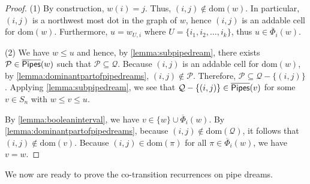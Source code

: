 \documentclass[12 pt]{amsart}
\newcommand{\dom}{\mathrm{dom}}
\numberwithin{equation}{section}
\theoremstyle{remark}
\newcommand{\kpipes}{\overline{\sf Pipes}}
\newcommand{\kcotransitionperms}{\overline{\Phi}}
\begin{document}
		\begin{proof}
			\noindent (1) By construction, $w(i) = j$. Thus, $(i,j)\notin \dom(w)$. 
			In particular, $(i,j)$ is a northwest most dot in the graph of $w$, hence $(i,j)$ is an addable cell for $\dom(w)$. Furthermore, $u=w_{U,i}$ where $U=\{i_1,i_2,\ldots,i_k\}$, thus $u\in \kcotransitionperms_{i}(w)$.
			
			\noindent (2)
			We have $w\leq u$ and hence, by \cref{lemma:subpipedream}, there exists $\mathcal{P} \in \kpipes(w)$ such that $\mathcal{P} \subseteq \mathcal{Q}$. 
			Because $(i,j)$ is an addable cell for $\dom(w)$, by \cref{lemma:dominantpartofpipedreams}, $(i,j)\notin \mathcal{P}$. 
			Therefore, $\mathcal{P} \subseteq \mathcal{Q}-\{(i,j)\}$. 
			Applying \cref{lemma:subpipedream}, we see that $\mathcal{Q}-\{(i,j)\} \in \kpipes(v)$ for some $v \in S_n$ with $w\leq v\leq u$. 
			
			By \cref{lemma:booleaninterval}, we have $v \in \{w\} \cup \kcotransitionperms_{i}(w)$. 
			By \cref{lemma:dominantpartofpipedreams}, because $(i,j)\notin \dom(\mathcal{Q})$, it follows that $(i,j)\notin \dom(v)$. 
			Because $(i,j) \in \dom(\pi)$ for all $\pi \in \kcotransitionperms_{i}(w)$, we have $v = w$.
		\end{proof}
	

		
		We now are ready to prove the co-transition recurrences on pipe dreams.		
		
\end{document}
